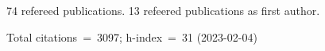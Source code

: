 74 refereed publications. 13 refeered publications as first author.

Total citations~=~3097; h-index~=~31 (2023-02-04)
